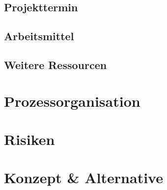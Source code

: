 		\subsection{Projekttermin}
		
		\subsection{Arbeitsmittel}
		
		\subsection{Weitere Ressourcen}
	
	\section{Prozessorganisation}

	\section{Risiken}
	
	\section{Konzept \& Alternative}